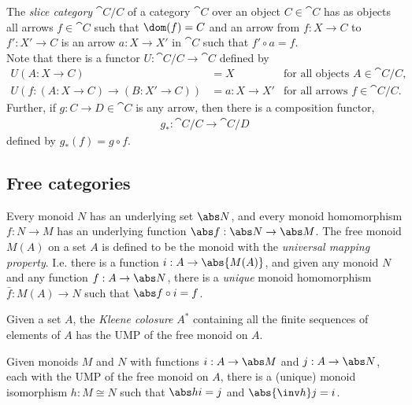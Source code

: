\documentclass{article}
\begin{document}
\begin{definition*}
    The \emph{slice category} $\cat C/C$ of a category $\cat C$ over an
    object $C\in\cat C$ has as objects all arrows $f\in\cat C$ such that
    $\dom(f)=C$ and an arrow from $f:X\to C$ to $f':X'\to C$ is an arrow
    $a:X\to X'$ in $\cat C$ such that $f'\circ a = f$.\\
    Note that there is a functor $U:\cat C/C \to \cat C$ defined by
    \begin{align*}
        U(A:X\to C) &= X &\text{for all objects }A\in\cat C/C,\\
        U(f:(A:X\to C)\to(B:X'\to C))&= a:X\to X' &\text{for all arrows }f\in\cat C/C.
    \end{align*}
    Further, if $g:C\to D\in\cat C$ is any arrow, then there is a composition
    functor,
    \begin{align*}
        g_*:\cat C/C\to\cat C/D
    \end{align*}
    defined by $g_*(f)= g\circ f$.
\end{definition*}

\subsection{Free categories}

\begin{definition}[UMP of $M(A)$]
    Every monoid $N$ has an underlying set $\abs N$, and every monoid
    homomorphism $f:N\to M$ has an underlying function $\abs f: \abs N
    \to \abs M$.
    The free monoid $M(A)$ on a set $A$ is defined to be
    the monoid with the \emph{universal mapping property}. 
    I.e. there is a function $i:A\to \abs{M(A)}$, and given any
    monoid $N$ and any function $f:A\to\abs N$, there is a
    \emph{unique} monoid homomorphism $\bar f: M(A)\to N$
    such that $\abs f \circ i = f$.
\end{definition}

\begin{proposition}
    Given a set $A$, the \emph{Kleene colosure} $A^*$ containing 
    all the finite sequences of elements of $A$ has the UMP of the
    free monoid on $A$.
\end{proposition}

\begin{proposition}
    Given monoids $M$ and $N$ with functions $i:A\to\abs M$ and
    $j:A\to\abs N$, each with the UMP of the free monoid on $A$,
    there is a (unique) monoid isomorphism $h:M\cong N$ such that
    $\abs h i=j$ and $\abs{\inv h}j = i$.
\end{proposition}
\end{document}
